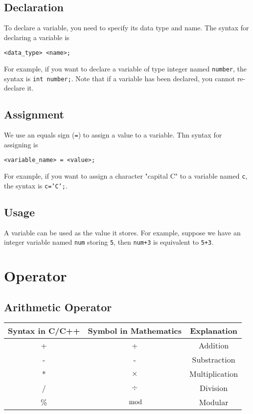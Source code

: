 \documentclass{report}
\begin{document}
    \subsection{Declaration}
    To declare a variable, you need to specify its data type and name. The syntax for declaring a variable is
    \begin{center}\texttt{<data\_type> <name>;}\end{center}
    For example, if you want to declare a variable of type integer named \texttt{number}, the syntax is \texttt{int number;}. Note that if a variable has been declared, you cannot re-declare it.

    \subsection{Assignment}
    We use an equals sign (\texttt{=}) to assign a value to a variable. Thn syntax for assigning is
    \begin{center}\texttt{<variable\_name> = <value>;}\end{center}
    For example, if you want to assign a character "capital C" to a variable named \texttt{c}, the syntax is \texttt{c='C';}.

    \subsection{Usage}
    A variable can be used as the value it stores. For example, suppose we have an integer variable named \texttt{num} storing \texttt{5}, then \texttt{num+3} is equivalent to \texttt{5+3}.

\section{Operator}
    \subsection{Arithmetic Operator}
    \begin{tabular}{|c|c|c|}
    Syntax in C/C++ &   Symbol in Mathematics  &    Explanation\\
    \hline
    +               &   +                      &    Addition\\
    -               &   -                      &    Substraction\\
    *               &   $\times$               &    Multiplication\\
    /               &   $\div$                 &    Division\\
    \%              &   $\mod$                 &    Modular\\
    \end{tabular}
    
\end{document}
